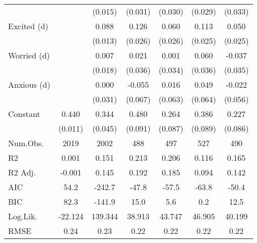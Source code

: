 \begin{table}[t]
\begin{tabular*}{\linewidth}{@{\extracolsep{\fill}}lcccccc}
 &  & (0.015) & (0.031) & (0.030) & (0.029) & (0.033) \\ 
Excited (d) &  & 0.088 & 0.126 & 0.060 & 0.113 & 0.050 \\ 
 &  & (0.013) & (0.026) & (0.026) & (0.025) & (0.025) \\ 
Worried (d) &  & 0.007 & 0.021 & 0.001 & 0.060 & -0.037 \\ 
 &  & (0.018) & (0.036) & (0.034) & (0.036) & (0.035) \\ 
Anxious (d) &  & 0.000 & -0.055 & 0.016 & 0.049 & -0.022 \\ 
 &  & (0.031) & (0.067) & (0.063) & (0.064) & (0.056) \\ 
Constant & 0.440 & 0.344 & 0.480 & 0.264 & 0.386 & 0.227 \\ 
{} & {(0.011)} & {(0.045)} & {(0.091)} & {(0.087)} & {(0.089)} & {(0.086)} \\ 
Num.Obs. & 2019 & 2002 & 488 & 497 & 527 & 490 \\ 
R2 & 0.001 & 0.151 & 0.213 & 0.206 & 0.116 & 0.165 \\ 
R2 Adj. & -0.001 & 0.145 & 0.192 & 0.185 & 0.094 & 0.142 \\ 
AIC & 54.2 & -242.7 & -47.8 & -57.5 & -63.8 & -50.4 \\ 
BIC & 82.3 & -141.9 & 15.0 & 5.6 & 0.2 & 12.5 \\ 
Log.Lik. & -22.124 & 139.344 & 38.913 & 43.747 & 46.905 & 40.199 \\ 
RMSE & 0.24 & 0.23 & 0.22 & 0.22 & 0.22 & 0.22 \\ 
\bottomrule
\end{tabular*}
\end{table}

